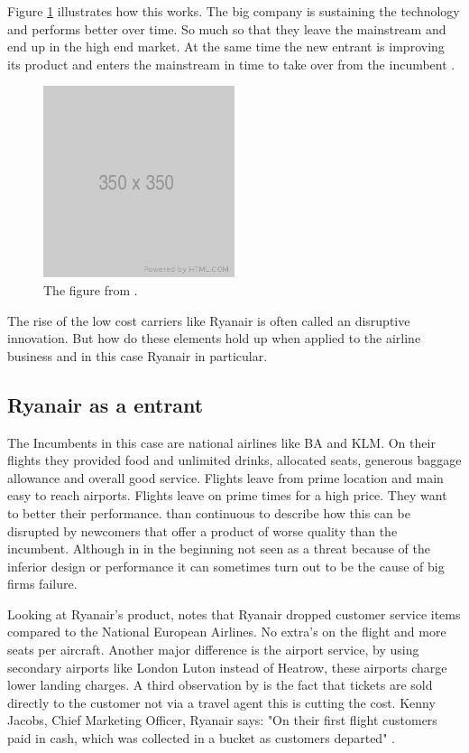\documentclass[a4paper, 11pt]{article}
\begin{document}
Figure \ref{fig:graph1} illustrates how this works. The big company is sustaining the technology and performs better over time. So much so that they leave the mainstream and end up in the high end market. At the same time the new entrant is improving its product and enters the mainstream in time to take over from the incumbent \cite{Christensen97}.

\begin{figure}[h!]
    \centering
    \includegraphics[width=0.5\textwidth]{350.png}
    \caption{The figure from \cite{Christensen97}.}
    \label{fig:graph1}
\end{figure}

The rise of the low cost carriers like Ryanair is often called an disruptive innovation.
But how do these elements hold up when applied to the airline business and in this case Ryanair in particular.


\subsection{Ryanair as a entrant}
\label{sec:this-is-a-section}


The Incumbents in this case are national airlines like BA and KLM. On their flights they provided food and unlimited drinks, allocated seats, generous baggage allowance and overall good service. Flights leave from prime location and main easy to reach airports. Flights leave on prime times for a high price. They want to better their performance. \cite{Christensen97} than continuous to describe how this can be disrupted by newcomers that offer a product of worse quality than the incumbent. Although in in the beginning not seen as a threat because of the inferior design or performance it can sometimes turn out to be the cause of big firms failure.

Looking at Ryanair's product, \cite{Barrett} notes that Ryanair dropped customer service items compared to the National European Airlines. No extra's on the flight and more seats per aircraft. Another major difference is the airport service, by using secondary airports like London Luton instead of Heatrow, these airports charge lower landing charges. A third observation by \cite{Barrett} is the fact that tickets are sold directly to the customer not via a travel agent this is cutting the cost. Kenny Jacobs, Chief Marketing Officer, Ryanair says: "On their first flight customers paid in cash, which was collected in a bucket as customers departed" \citep{ITBberlin}.
\end{document}

